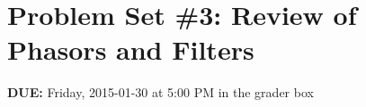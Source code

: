 


\section*{Problem Set \#3: Review of Phasors and Filters}

\textbf{DUE:} Friday, 2015-01-30 at 5:00 PM in the grader box


\eject




\eject








